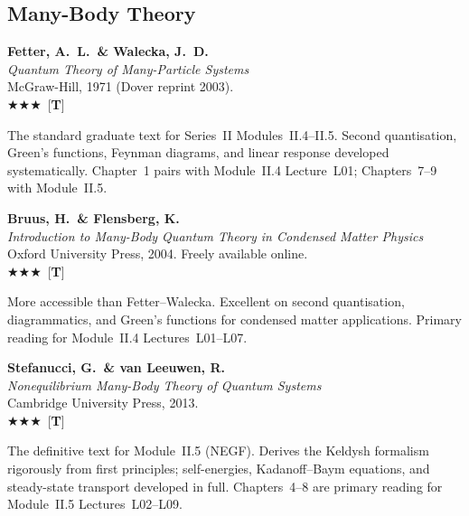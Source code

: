 \documentclass[11pt,a4paper]{article}
\newcommand{\essential}{$\bigstar\bigstar\bigstar$}
\newenvironment{bibentry}[1]{\begin{tcolorbox}[entrybox=#1,top=4pt,bottom=4pt]}{\end{tcolorbox}\smallskip}
\begin{document}
\subsection{Many-Body Theory}

\begin{bibentry}{t4light}
\textbf{Fetter, A.~L.\ \& Walecka, J.~D.}\\
\textit{Quantum Theory of Many-Particle Systems}\\
McGraw-Hill, 1971 (Dover reprint 2003).\\[3pt]
\essential\ [\textbf{T}]\\[3pt]
\begin{tcolorbox}[annotbox]
The standard graduate text for Series~II Modules~II.4--II.5. Second quantisation,
Green's functions, Feynman diagrams, and linear response developed systematically.
Chapter~1 pairs with Module~II.4 Lecture~L01; Chapters~7--9 with Module~II.5.
\end{tcolorbox}
\end{bibentry}

\begin{bibentry}{t4light}
\textbf{Bruus, H.\ \& Flensberg, K.}\\
\textit{Introduction to Many-Body Quantum Theory in Condensed Matter Physics}\\
Oxford University Press, 2004. Freely available online.\\[3pt]
\essential\ [\textbf{T}]\\[3pt]
\begin{tcolorbox}[annotbox]
More accessible than Fetter--Walecka. Excellent on second quantisation, diagrammatics,
and Green's functions for condensed matter applications. Primary reading for
Module~II.4 Lectures~L01--L07.
\end{tcolorbox}
\end{bibentry}

\begin{bibentry}{t4light}
\textbf{Stefanucci, G.\ \& van Leeuwen, R.}\\
\textit{Nonequilibrium Many-Body Theory of Quantum Systems}\\
Cambridge University Press, 2013.\\[3pt]
\essential\ [\textbf{T}]\\[3pt]
\begin{tcolorbox}[annotbox]
The definitive text for Module~II.5 (NEGF). Derives the Keldysh formalism
rigorously from first principles; self-energies, Kadanoff--Baym equations,
and steady-state transport developed in full. Chapters~4--8 are primary reading
for Module~II.5 Lectures~L02--L09.
\end{tcolorbox}
\end{bibentry}
\end{document}
